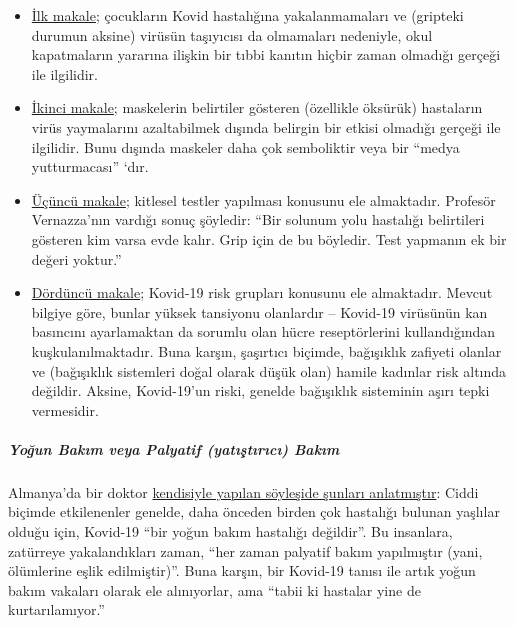 \begin{itemize}
\tightlist
\item
  \href{https://infekt.ch/2020/04/schulen-schliessen-hilfreich-oder-nicht/}{İlk
  makale}; çocukların Kovid hastalığına yakalanmamaları ve (gripteki
  durumun aksine) virüsün taşıyıcısı da olmamaları nedeniyle, okul
  kapatmaların yararına ilişkin bir tıbbi kanıtın hiçbir zaman olmadığı
  gerçeği ile ilgilidir.
\item
  \href{https://infekt.ch/2020/04/atemschutzmasken-fuer-alle-medienhype-oder-unverzichtbar/}{İkinci
  makale}; maskelerin belirtiler gösteren (özellikle öksürük) hastaların
  virüs yaymalarını azaltabilmek dışında belirgin bir etkisi olmadığı
  gerçeği ile ilgilidir. Bunu dışında maskeler daha çok semboliktir veya
  bir ``medya yutturmacası'' `dır.
\item
  \href{https://infekt.ch/2020/04/corona-testen-testen-und-kein-ende/}{Üçüncü
  makale}; kitlesel testler yapılması konusunu ele almaktadır. Profesör
  Vernazza'nın vardığı sonuç şöyledir: ``Bir solunum yolu hastalığı
  belirtileri gösteren kim varsa evde kalır. Grip için de bu böyledir.
  Test yapmanın ek bir değeri yoktur.''
\item
  \href{https://infekt.ch/2020/03/immunschwaeche-und-schwangerschaft-kein-covid-19-risikofaktor/}{Dördüncü
  makale}; Kovid-19 risk grupları konusunu ele almaktadır. Mevcut
  bilgiye göre, bunlar yüksek tansiyonu olanlardır -- Kovid-19 virüsünün
  kan basıncını ayarlamaktan da sorumlu olan hücre reseptörlerini
  kullandığından kuşkulanılmaktadır. Buna karşın, şaşırtıcı biçimde,
  bağışıklık zafiyeti olanlar ve (bağışıklık sistemleri doğal olarak
  düşük olan) hamile kadınlar risk altında değildir. Aksine, Kovid-19'un
  riski, genelde bağışıklık sisteminin aşırı tepki vermesidir.
\end{itemize}

\hypertarget{youx11fun-bakux131m-veya-palyatif-yatux131ux15ftux131rux131cux131-bakux131m}{%
\subparagraph{\texorpdfstring{\textbf{Yoğun Bakım veya Palyatif
(yatıştırıcı)
Bakım}}{Yoğun Bakım veya Palyatif (yatıştırıcı) Bakım}}\label{youx11fun-bakux131m-veya-palyatif-yatux131ux15ftux131rux131cux131-bakux131m}}

Almanya'da bir doktor
\href{https://www.ruhr24.de/ruhrgebiet/coronavirus-behandlung-intensivstation-nrw-lungenentzuendung-matthias-thoens-witten-zr-13645038.html}{kendisiyle
yapılan söyleşide şunları anlatmıştır}: Ciddi biçimde etkilenenler
genelde, daha önceden birden çok hastalığı bulunan yaşlılar olduğu için,
Kovid-19 ``bir yoğun bakım hastalığı değildir''. Bu insanlara, zatürreye
yakalandıkları zaman, ``her zaman palyatif bakım yapılmıştır (yani,
ölümlerine eşlik edilmiştir)''. Buna karşın, bir Kovid-19 tanısı ile
artık yoğun bakım vakaları olarak ele alınıyorlar, ama ``tabii ki
hastalar yine de kurtarılamıyor.''


